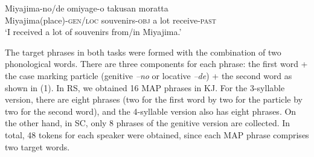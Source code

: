 \documentclass[output=paper]{LSP/langsci}
\begin{document}
\begin{table} 
\vskip11pt
\caption{Target words in two tasks (RS and SC) and their tones in SJ and KJ.}
\label{tab:3}
\end{table}

\ea
\label{ex:1}
\gll Miyajima-no/de     omiyage-o    takusan   moratta\\
{Miyajima(place)\textsc{{}-gen/loc}}  {souvenirs-\textsc{obj}}   {a lot}  {receive-\textsc{past}}\\ 
\glt `I received a lot of souvenirs from/in Miyajima.'
\z

The target phrases in both tasks were formed with the combination of two phonological words. There are three components for each phrase: the first word + the case marking particle (genitive \textit{–no} or locative \textit{–de}) + the second word as shown in (1). In RS, we obtained 16 MAP phrases in KJ. For the 3-syllable version, there are eight phrases (two for the first word by two for the particle by two for the second word), and the 4-syllable version also has eight phrases. On the other hand, in SC, only 8 phrases of the genitive version are collected. In total, 48 tokens for each speaker were obtained, since each MAP phrase comprises two target words.
\end{document}
